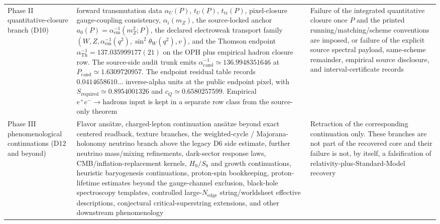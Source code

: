 \documentclass[11pt]{article}
\begin{document}
\begin{longtable}{@{}>{\raggedright\arraybackslash}p{}>{\raggedright\arraybackslash}p{}>{\raggedright\arraybackslash}p{}@{}}
Phase II quantitative-closure branch (D10) & forward transmutation data \(\alpha_U(P)\), \(t_U(P)\), \(t_{\mathrm{tr}}(P)\), pixel-closure gauge-coupling consistency, \(\alpha_i(m_Z)\), the source-locked anchor \(a_0(P)=\alpha_{\mathrm{em}}^{-1}(m_Z^2;P)\), the declared electroweak transport family \((W,Z,\alpha_{\mathrm{em}}^{-1}(q^2),\sin^2\theta_W(q^2),v)\), and the Thomson endpoint \(\alpha_{\mathrm{Th}}^{-1}=137.035999177(21)\) on the OPH plus empirical hadron closure row. The source-side audit trunk emits \(\alpha_{\mathrm{cand}}^{-1}\simeq136.9948351646\) at \(P_{\mathrm{cand}}\simeq1.6309720957\). The endpoint residual table records \(0.0414658610\ldots\) inverse-alpha units at the public endpoint pixel, with \(S_{\mathrm{required}}\simeq0.8954001326\) and \(c_Q\simeq0.6580257599\). Empirical \(e^+e^-\to\mathrm{hadrons}\) input is kept in a separate row class from the source-only theorem & Failure of the integrated quantitative closure once \(P\) and the printed running/matching/scheme conventions are imposed, or failure of the explicit source spectral payload, same-scheme remainder, empirical source disclosure, and interval-certificate records \\
Phase III phenomenological continuations (D12 and beyond) & Flavor ans\"atze, charged-lepton continuation ans\"atze beyond exact centered readback, texture branches, the weighted-cycle / Majorana-holonomy neutrino branch above the legacy D6 side estimate, further neutrino mass/mixing refinements, dark-sector response laws, CMB/inflation-replacement kernels, \(H_0/S_8\) and growth continuations, heuristic baryogenesis continuations, proton-spin bookkeeping, proton-lifetime estimates beyond the gauge-channel exclusion, black-hole spectroscopy templates, controlled large-\(N_{\mathrm{edge}}\) string/worldsheet effective descriptions, conjectural critical-superstring extensions, and other downstream phenomenology & Retraction of the corresponding continuation only. These branches are not part of the recovered core and their failure is not, by itself, a falsification of relativity-plus-Standard-Model recovery \\
\end{longtable}
\endgroup
\end{document}
